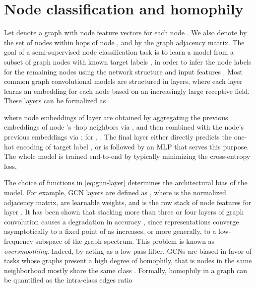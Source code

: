 \documentclass{esannV2p}
\begin{document}
\section{Node classification and homophily}\label{sec:background}
Let  denote a graph with node feature vectors  for each node .
We also denote by  the set of nodes within  hops of node , and by  the graph adjacency matrix.
The goal of a semi-supervised node classification task is to learn a model from a subset of graph nodes with known target labels , in order to infer the node labels  for the remaining nodes  using the network structure and input features .
Most common graph convolutional models are structured in  layers, where each layer learns an embedding for each node based on an increasingly large receptive field.
These layers can be formalized as \cite{Xu2019}

where node embeddings  of layer  are obtained by aggregating the previous embeddings  of node 's -hop neighbors via , and then combined with the node's previous embeddings  via ; for , .
The final layer  either directly predicts the one-hot encoding of target label , or is followed by an MLP that serves this purpose.
The whole model is trained end-to-end by typically minimizing the cross-entropy loss.

The choice of functions in \eqref{eq:gnn-layer} determines the architectural bias of the model.
For example, GCN \cite{Kipf2017} layers are defined as ,
where  is the normalized adjacency matrix,  are learnable weights, and  is the row stack of node features for layer .
It has been shown that stacking more than three or four layers of graph convolution causes a degradation in accuracy \cite{Li2018}, since representations  converge asymptotically to a fixed point of  as  increases, or more generally, to a low-frequency subspace of the graph spectrum.
This problem is known as \emph{oversmoothing}.
Indeed, by acting as a low-pass filter, GCNs are biased in favor of tasks whose graphs present a high degree of homophily, that is nodes in the same neighborhood mostly share the same class \citep{Zhu2020}.
Formally, homophily in a graph can be quantified \citep{Zhu2020} as the intra-class edges ratio
\end{document}
